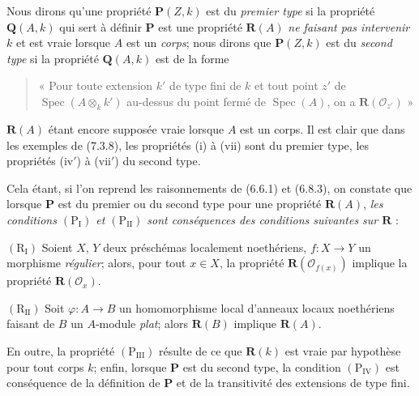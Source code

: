 \begin{env}[7.3.10]
\label{IV.2.s7.3.10-fr}
Nous dirons qu'une propriété $\boldsymbol P(Z,k)$ est du \emph{premier
type} si la propriété $\boldsymbol Q(A,k)$ qui sert à définir
$\boldsymbol P$ est une propriété $\boldsymbol R(A)$ \emph{ne faisant pas
intervenir $k$} et est vraie lorsque $A$ est un \emph{corps}; nous dirons
que $\boldsymbol P(Z,k)$ est du \emph{second type} si la propriété
$\boldsymbol Q(A,k)$ est de la forme
\begin{quote}
« Pour toute extension $k'$ de type fini de $k$ et tout point $z'$ de
$\operatorname{Spec}(A\otimes_k k')$ au-dessus du point fermé de
$\operatorname{Spec}(A)$, on a $\boldsymbol R(\mathscr O_{z'})$ »
\end{quote}
$\boldsymbol R(A)$ étant encore supposée vraie lorsque $A$ est un corps.
Il est clair que dans les exemples de (7.3.8), les propriétés (i) à (vii)
sont du premier type, les propriétés (iv$'$) à (vii$'$) du second type.

Cela étant, si l'on reprend les raisonnements de (6.6.1) et (6.8.3), on
constate que lorsque $\boldsymbol P$ est du premier ou du second type pour
une propriété $\boldsymbol R(A)$, \emph{les conditions
$(\mathrm P_{\mathrm I})$ et $(\mathrm P_{\mathrm{II}})$ sont
conséquences des conditions suivantes sur $\boldsymbol R$} :

$(\mathrm R_{\mathrm I})$ Soient $X$, $Y$ deux préschémas localement
noethériens, $f:X\to Y$ un morphisme \emph{régulier}; alors, pour tout
$x\in X$, la propriété $\boldsymbol R(\mathscr O_{f(x)})$ implique la
propriété $\boldsymbol R(\mathscr O_x)$.

$(\mathrm R_{\mathrm{II}})$ Soit $\varphi:A\to B$ un homomorphisme local
d'anneaux locaux noethériens faisant de $B$ un $A$-module \emph{plat};
alors $\boldsymbol R(B)$ implique $\boldsymbol R(A)$.

En outre, la propriété $(\mathrm P_{\mathrm{III}})$ résulte de ce que
$\boldsymbol R(k)$ est vraie par hypothèse pour tout corps $k$; enfin,
lorsque $\boldsymbol P$ est du second type, la condition
$(\mathrm P_{\mathrm{IV}})$ est conséquence de la définition de
$\boldsymbol P$ et de la transitivité des extensions de type fini.
\end{env}

